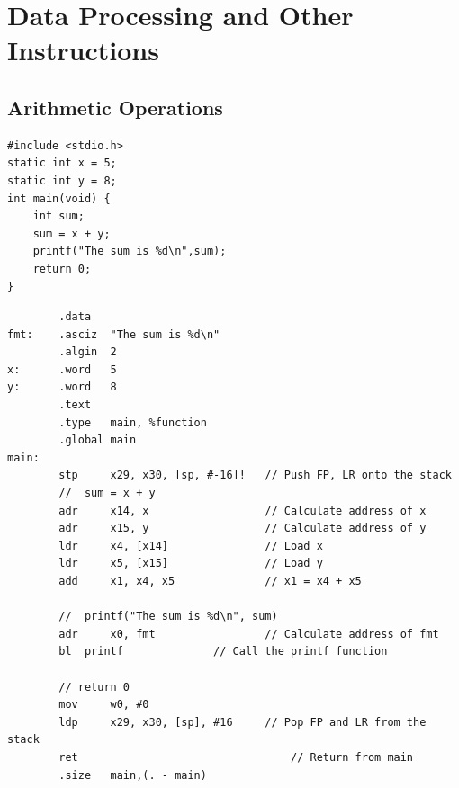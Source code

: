 \section{Data Processing and Other Instructions}

\subsection{Arithmetic Operations}
\begin{lstlisting}
#include <stdio.h>
static int x = 5;
static int y = 8;
int main(void) {
	int sum;
	sum = x + y;
	printf("The sum is %d\n",sum);
	return 0;
}
\end{lstlisting}
\begin{lstlisting}
		.data
fmt:	.asciz	"The sum is %d\n"
		.algin	2
x:		.word 	5
y:		.word 	8
		.text
		.type 	main, %function
		.global	main
main:
		stp 	x29, x30, [sp, #-16]! 	// Push FP, LR onto the stack
		//	sum = x + y
		adr 	x14, x					// Calculate address of x
		adr 	x15, y					// Calculate address of y 
		ldr 	x4, [x14] 				// Load x
		ldr 	x5, [x15] 				// Load y
		add 	x1, x4, x5 				// x1 = x4 + x5
		
		//  printf("The sum is %d\n", sum)
		adr 	x0, fmt 				// Calculate address of fmt
		bl 	printf 				// Call the printf function
		
		// return 0
		mov 	w0, #0
		ldp 	x29, x30, [sp], #16 	// Pop FP and LR from the stack
		ret 								// Return from main
		.size 	main,(. - main)
\end{lstlisting}

